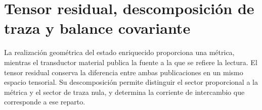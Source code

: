 %

\section{Tensor residual, descomposición de traza y balance covariante}
\label{vii:vii:sec:tensor-residual-balance}

La realización geométrica del estado enriquecido proporciona una métrica,
mientras el transductor material publica la fuente a la que se refiere la
lectura. El tensor residual conserva la diferencia entre ambas publicaciones
en un mismo espacio tensorial. Su descomposición permite distinguir el
sector proporcional a la métrica y el sector de traza nula, y determina
la corriente de intercambio que corresponde a ese reparto.

